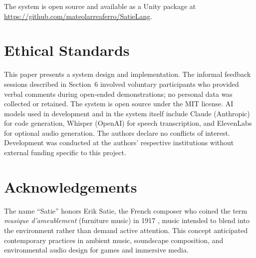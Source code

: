 \documentclass[sigconf,anonymous,review]{nimeart}
\begin{document}
The system is open source and available as a Unity package at \url{https://github.com/mateolarreaferro/SatieLang}.

\section{Ethical Standards}

This paper presents a system design and implementation. The informal feedback sessions described in Section~6 involved voluntary participants who provided verbal comments during open-ended demonstrations; no personal data was collected or retained. The system is open source under the MIT license. AI models used in development and in the system itself include Claude (Anthropic) for code generation, Whisper (OpenAI) for speech transcription, and ElevenLabs for optional audio generation. The authors declare no conflicts of interest. Development was conducted at the authors' respective institutions without external funding specific to this project.

\section*{Acknowledgements}

The name ``Satie'' honors Erik Satie, the French composer who coined the term \textit{musique d'ameublement} (furniture music) in 1917 \cite{satie1917furniture}, music intended to blend into the environment rather than demand active attention. This concept anticipated contemporary practices in ambient music, soundscape composition, and environmental audio design for games and immersive media.

\end{document}

